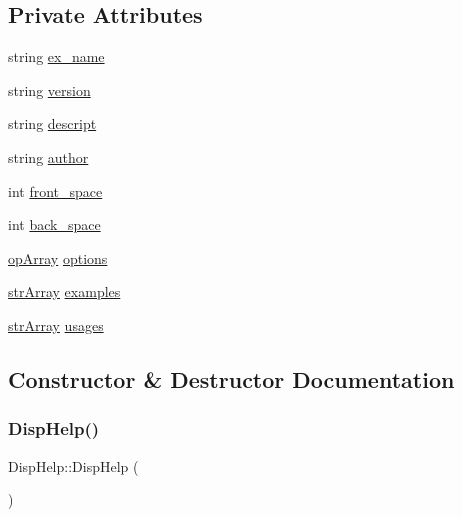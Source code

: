 \subsection*{Private Attributes}
\begin{DoxyCompactItemize}
\item 
string \mbox{\hyperlink{class_disp_help_aad84a1d8a970f5e1537a862d417e0dfe}{ex\+\_\+name}}
\item 
string \mbox{\hyperlink{class_disp_help_adf5903b92fc438a9398d4c80f340823a}{version}}
\item 
string \mbox{\hyperlink{class_disp_help_a95091c35b766cd059a011f83806c8bc1}{descript}}
\item 
string \mbox{\hyperlink{class_disp_help_a2f80e2435d81a237a78d86211edac8c0}{author}}
\item 
int \mbox{\hyperlink{class_disp_help_a641ee5d633d8a339cbb945c57f57ce93}{front\+\_\+space}}
\item 
int \mbox{\hyperlink{class_disp_help_a228d10b41c871e9ecabf3ea829c54496}{back\+\_\+space}}
\item 
\mbox{\hyperlink{disp__help_8h_a07d57c5fa50bacc9b37aa30e81a6901d}{op\+Array}} \mbox{\hyperlink{class_disp_help_a384cc0110cacc7763eb314493e6483ac}{options}}
\item 
\mbox{\hyperlink{disp__help_8h_acb0204177ba52d9ff9cd0117150d0bba}{str\+Array}} \mbox{\hyperlink{class_disp_help_aeb6fde055eefbc6888b1a33ae80a7025}{examples}}
\item 
\mbox{\hyperlink{disp__help_8h_acb0204177ba52d9ff9cd0117150d0bba}{str\+Array}} \mbox{\hyperlink{class_disp_help_a1ea249205321b5864b35743d9f8b42e3}{usages}}
\end{DoxyCompactItemize}


\subsection{Constructor \& Destructor Documentation}
\mbox{\label{class_disp_help_a2f0b69b1a355515cce11ccd7bdc56835}} 
\subsubsection{\texorpdfstring{DispHelp()}{DispHelp()}}
{\footnotesize\ttfamily Disp\+Help\+::\+Disp\+Help (\begin{DoxyParamCaption}{ }\end{DoxyParamCaption})\hspace{0.3cm}{\ttfamily [inline]}}

